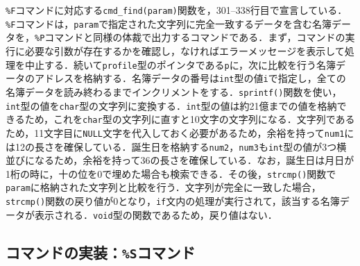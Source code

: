 \verb|%F|コマンドに対応する\verb|cmd_find(param)|関数を，301--338行目で宣言している．\verb|%F|コマンドは，\verb|param|で指定された文字列に完全一致するデータを含む名簿データを，\verb|%P|コマンドと同様の体裁で出力するコマンドである．まず，コマンドの実行に必要な引数が存在するかを確認し，なければエラーメッセージを表示して処理を中止する．続いて\verb|profile|型のポインタである\verb|p|に，次に比較を行う名簿データのアドレスを格納する．名簿データの番号は\verb|int|型の値\verb|i|で指定し，全ての名簿データを読み終わるまでインクリメントをする．\verb|sprintf()|関数を使い，\verb|int|型の値を\verb|char|型の文字列に変換する．\verb|int|型の値は約21億までの値を格納できるため，これを\verb|char|型の文字列に直すと10文字の文字列になる．文字列であるため，11文字目に\verb|NULL|文字を代入しておく必要があるため，余裕を持って\verb|num1|には12の長さを確保している．誕生日を格納する\verb|num2|，\verb|num3|も\verb|int|型の値が3つ横並びになるため，余裕を持って36の長さを確保している．なお，誕生日は月日が1桁の時に，十の位を0で埋めた場合も検索できる．その後，\verb|strcmp()|関数で\verb|param|に格納された文字列と比較を行う．文字列が完全に一致した場合，\verb|strcmp()|関数の戻り値が0となり，\verb|if|文内の処理が実行されて，該当する名簿データが表示される．\verb|void|型の関数であるため，戻り値はない．

\subsection{コマンドの実装：\texttt{\%S}コマンド}

